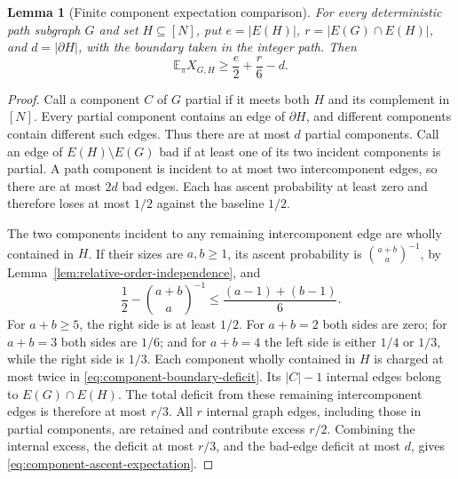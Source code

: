 \documentclass[11pt]{article}
\numberwithin{equation}{section}
\newtheorem{lemma}[theorem]{Lemma}
\theoremstyle{definition}
\theoremstyle{remark}
\newcommand{\E}{\mathbb E}
\newcommand{\1}{\mathbf 1}
\begin{document}
\begin{lemma}[Finite component expectation comparison]
\label{lem:component-ascent-expectation}
For every deterministic path subgraph \(G\) and set \(H\subseteq[N]\),
put \(e=|E(H)|\), \(r=|E(G)\cap E(H)|\), and
\(d=|\partial H|\), with the boundary taken in the integer path.
Then
\begin{equation}
\label{eq:component-ascent-expectation}
  \E_\pi X_{G,H}\ge \frac e2+\frac r6-d.
\end{equation}
\end{lemma}

\begin{proof}
Call a component \(C\) of \(G\) partial if it meets both \(H\)
and its complement in \([N]\).  Every partial component contains an
edge of \(\partial H\), and different components contain different
such edges.  Thus there are at most \(d\) partial components.
Call an edge of \(E(H)\setminus E(G)\) bad if at least one of its
two incident components is partial.  A path component is incident to
at most two intercomponent edges, so there are at most \(2d\) bad
edges.  Each has ascent probability at least zero and therefore loses
at most \(1/2\) against the baseline \(1/2\).

The two components incident to any remaining intercomponent edge are
wholly contained in \(H\).  If their sizes are \(a,b\ge1\), its
ascent probability is \(\binom{a+b}{a}^{-1}\), by
Lemma~\ref{lem:relative-order-independence}, and
\begin{equation}
\label{eq:component-boundary-deficit}
  \frac12-\binom{a+b}{a}^{-1}
  \le \frac{(a-1)+(b-1)}6.
\end{equation}
For \(a+b\ge5\), the right side is at least \(1/2\).
For \(a+b=2\) both sides are zero; for \(a+b=3\) both sides are
\(1/6\); and for \(a+b=4\) the left side is either \(1/4\)
or \(1/3\), while the right side is \(1/3\).
Each component wholly contained in \(H\) is charged at most twice
in \eqref{eq:component-boundary-deficit}.  Its \(|C|-1\) internal
edges belong to \(E(G)\cap E(H)\).  The total deficit from these
remaining intercomponent edges is therefore at most \(r/3\).
All \(r\) internal graph edges, including those in partial components,
are retained and contribute excess \(r/2\).  Combining the internal
excess, the deficit at most \(r/3\), and the bad-edge deficit at most
\(d\), gives \eqref{eq:component-ascent-expectation}.
\end{proof}
\end{document}
